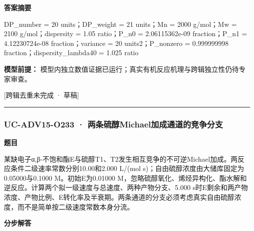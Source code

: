 \documentclass[UTF8,11pt,a4paper]{ctexart}
\begin{document}
\noindent\textbf{答案摘要}\par
DP\_number = 20 units；DP\_weight = 21 units；Mn = 2000 g/mol；Mw = 2100 g/mol；dispersity = 1.05 ratio；P\_n0 = 2.06115362e-09 fraction；P\_n1 = 4.12230724e-08 fraction；variance = 20 units2；P\_nonzero = 0.999999998 fraction；dispersity\_lambda40 = 1.025 ratio\par
\noindent\textbf{模型前提：}
模型内独立数值证据已运行；真实有机反应机理与跨辑独立性仍待专家审查。\par
\noindent\textcolor{red!65!black}{[跨辑去重未完成 · 草稿]} \par
\medskip\hrule\medskip
{}
\subsubsection*{UC-ADV15-O233 · 两条硫醇Michael加成通道的竞争分支}
\noindent\textbf{题目}\par
某缺电子α,β-不饱和酯E与硫醇T1、T2发生相互竞争的不可逆Michael加成。两反应条件二级速率常数分别10.00和2.000 L/(mol s)；自由硫醇浓度由大储库固定为0.05000与0.1000 M。初始E为0.01000 M，忽略硫醇氧化、烯烃异构化、酯水解和逆反应。计算两个拟一级速度与总速度、两种产物分支、5.000 s时E剩余和两产物浓度、产物比例、E转化率及半衰期。两条通道的分支必须考虑真实自由硫醇浓度，而不是简单按二级速度常数本身分流。\par
\medskip\noindent\textbf{分步解答}
\end{document}
